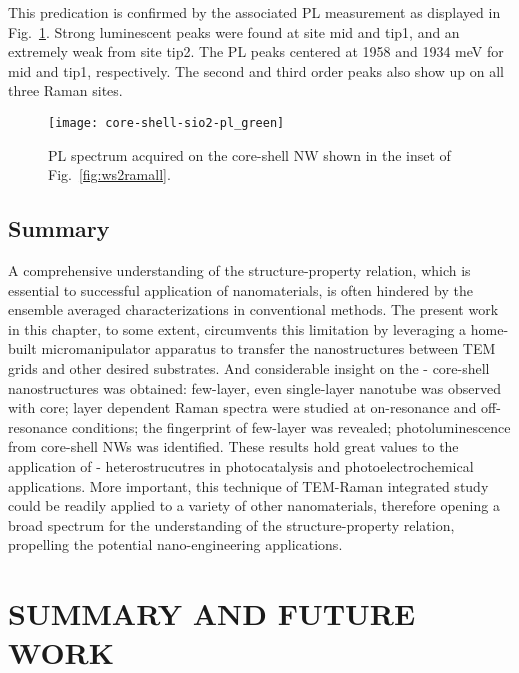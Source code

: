 This predication is confirmed by the associated PL measurement as displayed in Fig.~\ref{fig:ws2plgreen}. Strong luminescent peaks were found at site mid and tip1, and an extremely weak from site tip2. The PL peaks centered at 1958 and 1934 meV for mid and tip1, respectively. The second and third order peaks also show up on all three Raman sites. 

\begin{figure}[htb]
\centering
\texttt{[image: core-shell-sio2-pl\_green]}
\caption[PL spectra of - on -Si]{PL spectrum acquired on the core-shell NW shown in the inset of Fig.~\ref{fig:ws2ramall}.}
\label{fig:ws2plgreen}
\end{figure}

\section{Summary} 

A comprehensive understanding of the structure-property relation, which is essential to successful application of nanomaterials, is often hindered by the ensemble averaged characterizations in conventional methods. The present work in this chapter, to some extent, circumvents this limitation by leveraging a home-built micromanipulator apparatus to transfer the nanostructures between TEM grids and other desired substrates. And considerable insight on the - core-shell nanostructures was obtained: few-layer, even single-layer  nanotube was observed with  core; layer dependent Raman spectra were studied at on-resonance and off-resonance conditions; the fingerprint of few-layer  was revealed; photoluminescence from core-shell NWs was identified. These results hold great values to the application of - heterostrucutres in photocatalysis and photoelectrochemical applications. More important, this technique of TEM-Raman integrated study could be readily applied to a variety of other nanomaterials, therefore opening a broad spectrum for the understanding of the structure-property relation, propelling the potential nano-engineering applications. 

\chapter{SUMMARY AND FUTURE WORK}


